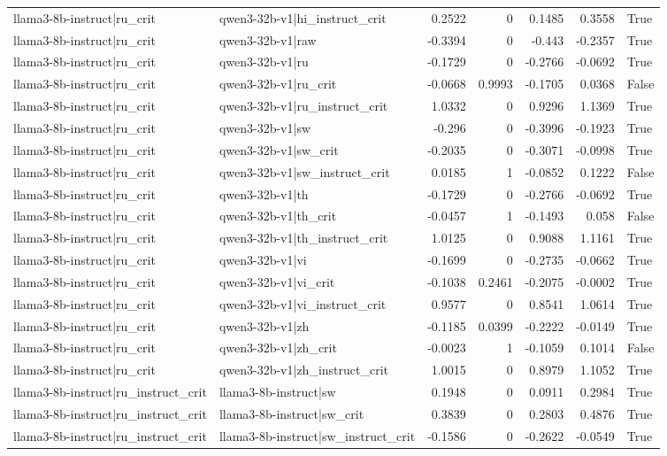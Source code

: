 \begin{table}
\begin{tabular}{l l r r r r l}
llama3-8b-instruct|ru_crit & qwen3-32b-v1|hi_instruct_crit & 0.2522 & 0 & 0.1485 & 0.3558 & True \\
llama3-8b-instruct|ru_crit & qwen3-32b-v1|raw & -0.3394 & 0 & -0.443 & -0.2357 & True \\
llama3-8b-instruct|ru_crit & qwen3-32b-v1|ru & -0.1729 & 0 & -0.2766 & -0.0692 & True \\
llama3-8b-instruct|ru_crit & qwen3-32b-v1|ru_crit & -0.0668 & 0.9993 & -0.1705 & 0.0368 & False \\
llama3-8b-instruct|ru_crit & qwen3-32b-v1|ru_instruct_crit & 1.0332 & 0 & 0.9296 & 1.1369 & True \\
llama3-8b-instruct|ru_crit & qwen3-32b-v1|sw & -0.296 & 0 & -0.3996 & -0.1923 & True \\
llama3-8b-instruct|ru_crit & qwen3-32b-v1|sw_crit & -0.2035 & 0 & -0.3071 & -0.0998 & True \\
llama3-8b-instruct|ru_crit & qwen3-32b-v1|sw_instruct_crit & 0.0185 & 1 & -0.0852 & 0.1222 & False \\
llama3-8b-instruct|ru_crit & qwen3-32b-v1|th & -0.1729 & 0 & -0.2766 & -0.0692 & True \\
llama3-8b-instruct|ru_crit & qwen3-32b-v1|th_crit & -0.0457 & 1 & -0.1493 & 0.058 & False \\
llama3-8b-instruct|ru_crit & qwen3-32b-v1|th_instruct_crit & 1.0125 & 0 & 0.9088 & 1.1161 & True \\
llama3-8b-instruct|ru_crit & qwen3-32b-v1|vi & -0.1699 & 0 & -0.2735 & -0.0662 & True \\
llama3-8b-instruct|ru_crit & qwen3-32b-v1|vi_crit & -0.1038 & 0.2461 & -0.2075 & -0.0002 & True \\
llama3-8b-instruct|ru_crit & qwen3-32b-v1|vi_instruct_crit & 0.9577 & 0 & 0.8541 & 1.0614 & True \\
llama3-8b-instruct|ru_crit & qwen3-32b-v1|zh & -0.1185 & 0.0399 & -0.2222 & -0.0149 & True \\
llama3-8b-instruct|ru_crit & qwen3-32b-v1|zh_crit & -0.0023 & 1 & -0.1059 & 0.1014 & False \\
llama3-8b-instruct|ru_crit & qwen3-32b-v1|zh_instruct_crit & 1.0015 & 0 & 0.8979 & 1.1052 & True \\
llama3-8b-instruct|ru_instruct_crit & llama3-8b-instruct|sw & 0.1948 & 0 & 0.0911 & 0.2984 & True \\
llama3-8b-instruct|ru_instruct_crit & llama3-8b-instruct|sw_crit & 0.3839 & 0 & 0.2803 & 0.4876 & True \\
llama3-8b-instruct|ru_instruct_crit & llama3-8b-instruct|sw_instruct_crit & -0.1586 & 0 & -0.2622 & -0.0549 & True \\

\end{tabular}
\end{table}
